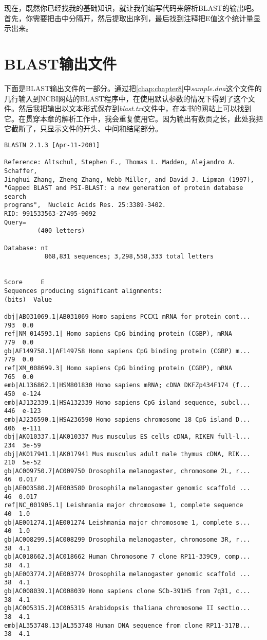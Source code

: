现在，既然你已经找我的基础知识，就让我们编写代码来解析BLAST的输出吧。首先，你需要把击中分隔开，然后提取出序列，最后找到注释把E值这个统计量显示出来。

\section{BLAST输出文件}
  下面是BLAST输出文件的一部分。通过把\autoref{chap:chapter8}中\textit{sample.dna}这个文件的几行输入到NCBI网站的BLAST程序中，在使用默认参数的情况下得到了这个文件。然后我把输出以文本形式保存到\textit{blast.txt}文件中，在本书的网站上可以找到它。在贯穿本章的解析工作中，我会重复使用它。因为输出有数页之长，此处我把它截断了，只显示文件的开头、中间和结尾部分。

\begin{lstlisting}
BLASTN 2.1.3 [Apr-11-2001]

Reference: Altschul, Stephen F., Thomas L. Madden, Alejandro A. Schaffer,
Jinghui Zhang, Zheng Zhang, Webb Miller, and David J. Lipman (1997),
"Gapped BLAST and PSI-BLAST: a new generation of protein database search
programs",  Nucleic Acids Res. 25:3389-3402.
RID: 991533563-27495-9092
Query=
         (400 letters)

Database: nt
           868,831 sequences; 3,298,558,333 total letters

                                                                   Score     E
Sequences producing significant alignments:                        (bits)  Value

dbj|AB031069.1|AB031069 Homo sapiens PCCX1 mRNA for protein cont...   793  0.0
ref|NM_014593.1| Homo sapiens CpG binding protein (CGBP), mRNA        779  0.0
gb|AF149758.1|AF149758 Homo sapiens CpG binding protein (CGBP) m...   779  0.0
ref|XM_008699.3| Homo sapiens CpG binding protein (CGBP), mRNA        765  0.0
emb|AL136862.1|HSM801830 Homo sapiens mRNA; cDNA DKFZp434F174 (f...   450  e-124
emb|AJ132339.1|HSA132339 Homo sapiens CpG island sequence, subcl...   446  e-123
emb|AJ236590.1|HSA236590 Homo sapiens chromosome 18 CpG island D...   406  e-111
dbj|AK010337.1|AK010337 Mus musculus ES cells cDNA, RIKEN full-l...   234  3e-59
dbj|AK017941.1|AK017941 Mus musculus adult male thymus cDNA, RIK...   210  5e-52
gb|AC009750.7|AC009750 Drosophila melanogaster, chromosome 2L, r...    46  0.017
gb|AE003580.2|AE003580 Drosophila melanogaster genomic scaffold ...    46  0.017
ref|NC_001905.1| Leishmania major chromosome 1, complete sequence      40  1.0
gb|AE001274.1|AE001274 Leishmania major chromosome 1, complete s...    40  1.0
gb|AC008299.5|AC008299 Drosophila melanogaster, chromosome 3R, r...    38  4.1
gb|AC018662.3|AC018662 Human Chromosome 7 clone RP11-339C9, comp...    38  4.1
gb|AE003774.2|AE003774 Drosophila melanogaster genomic scaffold ...    38  4.1
gb|AC008039.1|AC008039 Homo sapiens clone SCb-391H5 from 7q31, c...    38  4.1
gb|AC005315.2|AC005315 Arabidopsis thaliana chromosome II sectio...    38  4.1
emb|AL353748.13|AL353748 Human DNA sequence from clone RP11-317B...    38  4.1


\end{lstlisting}
